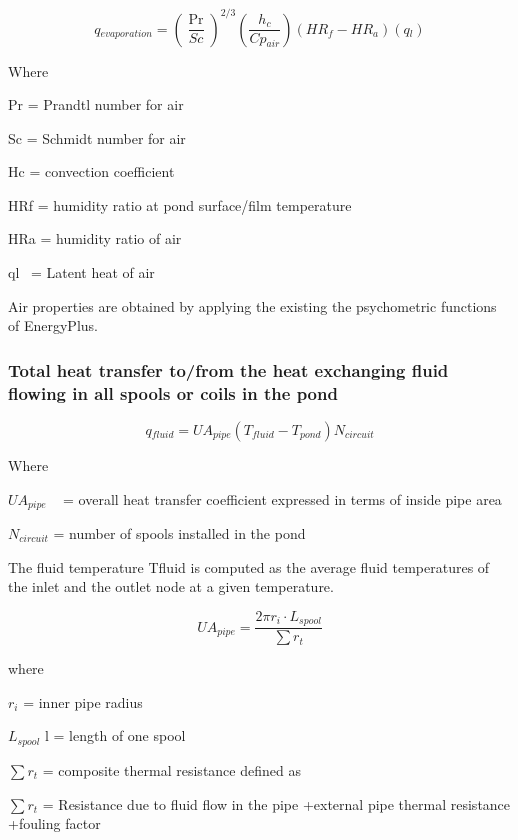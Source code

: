 \begin{equation}
q{}_{evaporation} = {\left( {\frac{{\Pr }}{{Sc}}} \right)^{2/3}}\left( {\frac{{h{}_c}}{{Cp{}_{air}}}} \right)\left( {HR{}_f - HR{}_a} \right)\left( {q{}_l} \right)
\end{equation}

Where

Pr = Prandtl number for air

Sc = Schmidt number for air

Hc = convection coefficient

HRf = humidity ratio at pond surface/film temperature

HRa = humidity ratio of air

ql~ = Latent heat of air

Air properties are obtained by applying the existing the psychometric functions of EnergyPlus.

\subsubsection{Total heat transfer to/from the heat exchanging fluid flowing in all spools or coils in the pond}\label{total-heat-transfer-tofrom-the-heat-exchanging-fluid-flowing-in-all-spools-or-coils-in-the-pond}

\begin{equation}
q{}_{fluid} = UA{}_{pipe}(T{}_{fluid} - T{}_{pond})N{}_{circuit}
\end{equation}

Where

\(UA{}_{pipe}\) ~ = overall heat transfer coefficient expressed in terms of inside pipe area

\(N{}_{circuit}\) = number of spools installed in the pond

The fluid temperature Tfluid is computed as the average fluid temperatures of the inlet and the outlet node at a given temperature.

\begin{equation}
U{A_{pipe}} = \frac{{2\pi {r_i}\cdot {L_{spool}}}}{{\sum {{r_t}} }}
\end{equation}

where

\({r_i}\) = inner pipe radius

\({L_{spool}}\) l = length of one spool

\(\sum {{r_t}}\) = composite thermal resistance defined as

\(\sum {{r_t}}\) = Resistance due to fluid flow in the pipe +external pipe thermal resistance +fouling factor

